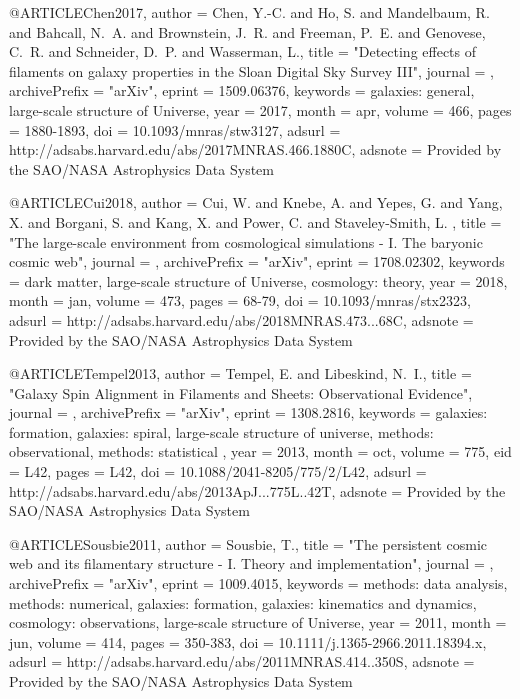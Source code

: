 \documentclass{aa}
\begin{document}
{{{{{{{{{{{{{{@ARTICLE{Chen2017,
   author = {{Chen}, Y.-C. and {Ho}, S. and {Mandelbaum}, R. and {Bahcall}, N.~A. and 
	{Brownstein}, J.~R. and {Freeman}, P.~E. and {Genovese}, C.~R. and 
	{Schneider}, D.~P. and {Wasserman}, L.},
    title = "{Detecting effects of filaments on galaxy properties in the Sloan Digital Sky Survey III}",
  journal = {\mnras},
archivePrefix = "arXiv",
   eprint = {1509.06376},
 keywords = {galaxies: general, large-scale structure of Universe},
     year = 2017,
    month = apr,
   volume = 466,
    pages = {1880-1893},
      doi = {10.1093/mnras/stw3127},
   adsurl = {http://adsabs.harvard.edu/abs/2017MNRAS.466.1880C},
  adsnote = {Provided by the SAO/NASA Astrophysics Data System}
}

@ARTICLE{Cui2018,
   author = {{Cui}, W. and {Knebe}, A. and {Yepes}, G. and {Yang}, X. and 
	{Borgani}, S. and {Kang}, X. and {Power}, C. and {Staveley-Smith}, L.
	},
    title = "{The large-scale environment from cosmological simulations - I. The baryonic cosmic web}",
  journal = {\mnras},
archivePrefix = "arXiv",
   eprint = {1708.02302},
 keywords = {dark matter, large-scale structure of Universe, cosmology: theory},
     year = 2018,
    month = jan,
   volume = 473,
    pages = {68-79},
      doi = {10.1093/mnras/stx2323},
   adsurl = {http://adsabs.harvard.edu/abs/2018MNRAS.473...68C},
  adsnote = {Provided by the SAO/NASA Astrophysics Data System}
}

@ARTICLE{Tempel2013,
   author = {{Tempel}, E. and {Libeskind}, N.~I.},
    title = "{Galaxy Spin Alignment in Filaments and Sheets: Observational Evidence}",
  journal = {\apjl},
archivePrefix = "arXiv",
   eprint = {1308.2816},
 keywords = {galaxies: formation, galaxies: spiral, large-scale structure of universe, methods: observational, methods: statistical },
     year = 2013,
    month = oct,
   volume = 775,
      eid = {L42},
    pages = {L42},
      doi = {10.1088/2041-8205/775/2/L42},
   adsurl = {http://adsabs.harvard.edu/abs/2013ApJ...775L..42T},
  adsnote = {Provided by the SAO/NASA Astrophysics Data System}
}

@ARTICLE{Sousbie2011,
   author = {{Sousbie}, T.},
    title = "{The persistent cosmic web and its filamentary structure - I. Theory and implementation}",
  journal = {\mnras},
archivePrefix = "arXiv",
   eprint = {1009.4015},
 keywords = {methods: data analysis, methods: numerical, galaxies: formation, galaxies: kinematics and dynamics, cosmology: observations, large-scale structure of Universe},
     year = 2011,
    month = jun,
   volume = 414,
    pages = {350-383},
      doi = {10.1111/j.1365-2966.2011.18394.x},
   adsurl = {http://adsabs.harvard.edu/abs/2011MNRAS.414..350S},
  adsnote = {Provided by the SAO/NASA Astrophysics Data System}
}

}}}}}}}}}}}}}}
\end{document}
